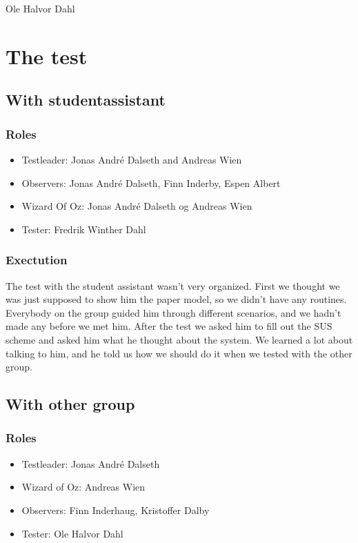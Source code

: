 \documentclass{article}
\begin{document}
Ole Halvor Dahl






\section{The test}
\subsection{With studentassistant}
\subsubsection*{Roles}
\begin{itemize}
\item Testleader: Jonas André Dalseth and Andreas Wien
\item Observers: Jonas André Dalseth, Finn Inderby, Espen Albert
\item Wizard Of Oz: Jonas André Dalseth og Andreas Wien
\item Tester: Fredrik Winther Dahl
\end{itemize}

\subsubsection*{Exectution}
The test with the student assistant wasn't very organized. First we thought we was just supposed to show him the paper model, so we didn't have any routines. Everybody on the group guided him through different scenarios, and we hadn't made any before we met him. After the test we asked him to fill out the SUS scheme and asked him what he thought about the system. We learned a lot about talking to him, and he told us how we should do it when we tested with the other group. 
\subsection{With other group}
\subsubsection*{Roles}
\begin{itemize}
\item Testleader: Jonas André Dalseth
\item Wizard of Oz: Andreas Wien
\item Observers: Finn Inderhaug, Kristoffer Dalby
\item Tester: Ole Halvor Dahl
\end{itemize}
\end{document}
